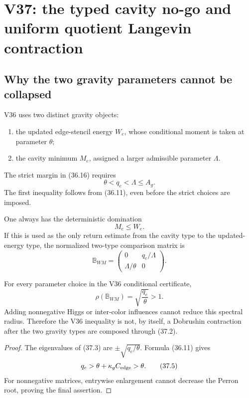 \documentclass[11pt]{article}
\theoremstyle{remark}
\begin{document}
\section{V37: the typed cavity no-go and uniform quotient Langevin contraction}
\label{sec:v17v37}

\subsection{Why the two gravity parameters cannot be collapsed}

V36 uses two distinct gravity objects:
\begin{enumerate}[label=\textup{(\roman*)},leftmargin=3em]
\item the updated edge-stencil energy \(W_e\), whose conditional moment
is taken at parameter \(\theta\);
\item the cavity minimum \(M_e\), assigned a larger admissible parameter
\(\Lambda\).
\end{enumerate}
The strict margin in (36.16) requires
\[
 \theta<q_e<\Lambda\leq A_g.                       \tag{37.1}
\]
The first inequality follows from (36.11), even before the strict
choices are imposed.

One always has the deterministic domination
\[
 M_e\leq W_e.                                      \tag{37.2}
\]
If this is used as the only return estimate from the cavity type to the
updated-energy type, the normalized two-type comparison matrix is
\[
 \mathbb B_{WM}
 =\begin{pmatrix}
 0&q_e/\Lambda\\
 \Lambda/\theta&0
 \end{pmatrix}.                                   \tag{37.3}
\]

\begin{countertheorem}
\label{ctr:v17v37-typed}
For every parameter choice in the V36 conditional certificate,
\[
 \boxed{
 \rho(\mathbb B_{WM})
 =\sqrt{\frac{q_e}{\theta}}>1.}                    \tag{37.4}
\]
Adding nonnegative Higgs or inter-color influences cannot reduce this
spectral radius.  Therefore the V36 inequality is not, by itself, a
Dobrushin contraction after the two gravity types are composed through
(37.2).
\end{countertheorem}

\begin{proof}
The eigenvalues of (37.3) are
\(\pm\sqrt{q_e/\theta}\).  Formula (36.11) gives
\[
 q_e>\theta+\kappa_gC_{\rm edge}>\theta.           \tag{37.5}
\]
For nonnegative matrices, entrywise enlargement cannot decrease the
Perron root, proving the final assertion.
\end{proof}
\end{document}
